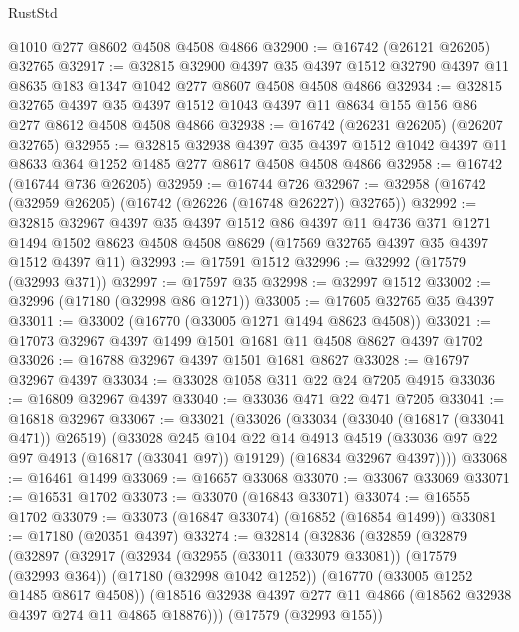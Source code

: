 \begin{lexlean}{RustStd}
\begin{coremodule}
{\begin{coremodule}
{{{{{{{{{{{{{{{{{{{{{{{{{{{{{{{{{{{{{{{{{{{{{{{{{{{{{{{    @1010
    @277
    @8602
    @4508
    @4508
    @4866
@32900 := @16742 (@26121 @26205) @32765
@32917 := @32815
    @32900
    @4397
    @35
    @4397
    @1512
    @32790
    @4397
    @11
    @8635
    @183
    @1347
    @1042
    @277
    @8607
    @4508
    @4508
    @4866
@32934 := @32815
    @32765
    @4397
    @35
    @4397
    @1512
    @1043
    @4397
    @11
    @8634
    @155
    @156
    @86
    @277
    @8612
    @4508
    @4508
    @4866
@32938 := @16742 (@26231 @26205) (@26207 @32765)
@32955 := @32815
    @32938
    @4397
    @35
    @4397
    @1512
    @1042
    @4397
    @11
    @8633
    @364
    @1252
    @1485
    @277
    @8617
    @4508
    @4508
    @4866
@32958 := @16742 (@16744 @736 @26205)
@32959 := @16744 @726
@32967 := @32958 (@16742 (@32959 @26205) (@16742 (@26226 (@16748 @26227)) @32765))
@32992 := @32815
    @32967
    @4397
    @35
    @4397
    @1512
    @86
    @4397
    @11
    @4736
    @371
    @1271
    @1494
    @1502
    @8623
    @4508
    @4508
    @8629
    (@17569 @32765 @4397 @35 @4397 @1512 @4397 @11)
@32993 := @17591 @1512
@32996 := @32992 (@17579 (@32993 @371))
@32997 := @17597 @35
@32998 := @32997 @1512
@33002 := @32996 (@17180 (@32998 @86 @1271))
@33005 := @17605 @32765 @35 @4397
@33011 := @33002 (@16770 (@33005 @1271 @1494 @8623 @4508))
@33021 := @17073 @32967 @4397 @1499 @1501 @1681 @11 @4508 @8627 @4397 @1702
@33026 := @16788 @32967 @4397 @1501 @1681 @8627
@33028 := @16797 @32967 @4397
@33034 := @33028 @1058 @311 @22 @24 @7205 @4915
@33036 := @16809 @32967 @4397
@33040 := @33036 @471 @22 @471 @7205
@33041 := @16818 @32967
@33067 := @33021
    (@33026
      (@33034
        (@33040 (@16817 (@33041 @471)) @26519)
        (@33028
          @245
          @104
          @22
          @14
          @4913
          @4519
          (@33036 @97 @22 @97 @4913 (@16817 (@33041 @97)) @19129)
          (@16834 @32967 @4397))))
@33068 := @16461 @1499
@33069 := @16657 @33068
@33070 := @33067 @33069
@33071 := @16531 @1702
@33073 := @33070 (@16843 @33071)
@33074 := @16555 @1702
@33079 := @33073 (@16847 @33074) (@16852 (@16854 @1499))
@33081 := @17180 (@20351 @4397)
@33274 := @32814
    (@32836
      (@32859
        (@32879
          (@32897
            (@32917
              (@32934
                (@32955
                  (@33011 (@33079 @33081))
                  (@17579 (@32993 @364))
                  (@17180 (@32998 @1042 @1252))
                  (@16770 (@33005 @1252 @1485 @8617 @4508))
                  (@18516 @32938 @4397 @277 @11 @4866 (@18562 @32938 @4397 @274 @11 @4865 @18876)))
                (@17579 (@32993 @155))
}}}}}}}}}}}}}}}}}}}}}}}}}}}}}}}}}}}}}}}}}}}}}}}}}}}}}}}
\end{coremodule}}
\end{coremodule}
\end{lexlean}
